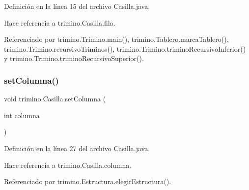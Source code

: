 Definición en la línea 15 del archivo Casilla.\+java.


\begin{DoxyCode}{0}

\end{DoxyCode}


Hace referencia a trimino.\+Casilla.\+fila.



Referenciado por trimino.\+Trimino.\+main(), trimino.\+Tablero.\+marca\+Tablero(), trimino.\+Trimino.\+recursivo\+Triminos(), trimino.\+Trimino.\+trimino\+Recursivo\+Inferior() y trimino.\+Trimino.\+trimino\+Recursivo\+Superior().

\mbox{\label{classtrimino_1_1Casilla_ab0fe6a942c41dbe145b8188b354a9de0}} 
\subsubsection{\texorpdfstring{setColumna()}{setColumna()}}
{\footnotesize\ttfamily void trimino.\+Casilla.\+set\+Columna (\begin{DoxyParamCaption}\item[{int}]{columna }\end{DoxyParamCaption})}



Definición en la línea 27 del archivo Casilla.\+java.


\begin{DoxyCode}{0}

\end{DoxyCode}


Hace referencia a trimino.\+Casilla.\+columna.



Referenciado por trimino.\+Estructura.\+elegir\+Estructura().

\mbox{\label{classtrimino_1_1Casilla_abe0c759d79a47b35e8dc03819edf6969}} 
